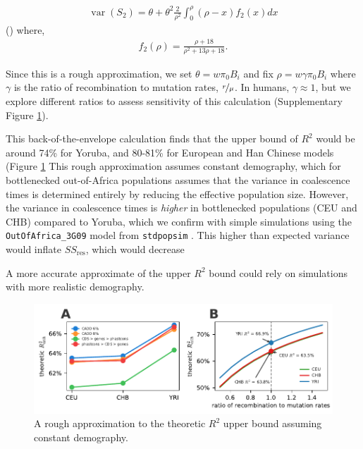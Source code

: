 \documentclass[11pt]{article}
\DeclareMathOperator{\var}{var}
\begin{document}
\begin{align}
    \var(S_2) = \theta + \theta^2 \frac{2}{\rho^2} \int_0^\rho (\rho - x) f_2(x) dx
\end{align}
(\cite[eq. 7.20]{Wakeley2009-ua}) where,
\begin{align}
    f_2(\rho) = \frac{\rho + 18}{\rho^2 + 13 \rho + 18}.
\end{align}

Since this is a rough approximation,  we set $\theta = w \pi_0 B_i$ and fix
$\rho = w \gamma \pi_0 B_i$ where $\gamma$ is the ratio of recombination to
mutation rates, $\nicefrac{r}{\mu}$. In humans, $\gamma \approx 1$, but we
explore different ratios to assess sensitivity of this calculation
(Supplementary Figure \ref{suppfig:r2_upper}). 

This back-of-the-envelope calculation finds that the upper bound of $R^2$ would
be around 74\% for Yoruba, and 80-81\% for European and Han Chinese models
(Figure \ref{suppfig:r2_upper} This rough approximation assumes constant
demography, which for bottlenecked out-of-Africa populations assumes that the
variance in coalescence times is determined entirely by reducing the effective
population size. However, the variance in coalescence times is \emph{higher} in
bottlenecked populations (CEU and CHB) compared to Yoruba, which we confirm
with simple simulations using the \texttt{OutOfAfrica\_3G09} model from
\texttt{stdpopsim} \parencite{Gutenkunst2009-pg,Adrion2020-cf}. This higher
than expected variance would inflate $SS_\text{res}$, which would decrease

A more accurate approximate of the upper $R^2$ bound could rely on simulations
with more realistic demography.

\begin{figure}[htbp] \centering
    \includegraphics[width=\textwidth]{figures/supplementary/suppfigure_drift_R2.pdf}
    \caption{A rough approximation to the theoretic $R^2$ upper bound assuming constant demography.}
  \label{suppfig:r2_upper}
\end{figure}
\end{document}
